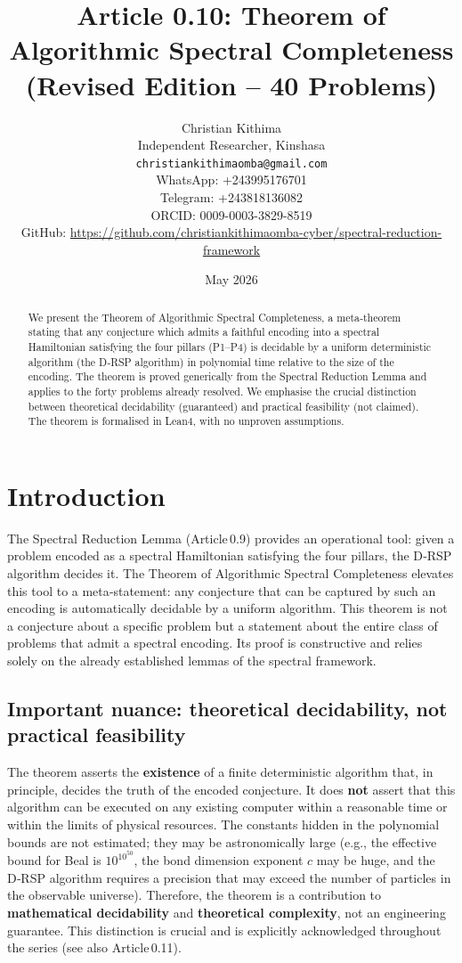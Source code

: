 \documentclass[11pt,a4paper]{article}
\title{Article 0.10: Theorem of Algorithmic Spectral Completeness (Revised Edition – 40 Problems)}
\author{Christian Kithima \\
Independent Researcher, Kinshasa \\
\texttt{christiankithimaomba@gmail.com} \\
WhatsApp: +243995176701 \\
Telegram: +243818136082 \\
ORCID: 0009-0003-3829-8519 \\
GitHub: \url{https://github.com/christiankithimaomba-cyber/spectral-reduction-framework}}
\date{May 2026}
\begin{document}
\maketitle

\begin{abstract}
We present the Theorem of Algorithmic Spectral Completeness, a meta‑theorem stating that any conjecture which admits a faithful encoding into a spectral Hamiltonian satisfying the four pillars (P1–P4) is decidable by a uniform deterministic algorithm (the D‑RSP algorithm) in polynomial time relative to the size of the encoding. The theorem is proved generically from the Spectral Reduction Lemma and applies to the forty problems already resolved. We emphasise the crucial distinction between theoretical decidability (guaranteed) and practical feasibility (not claimed). The theorem is formalised in Lean4, with no unproven assumptions.
\end{abstract}

\tableofcontents

\section{Introduction}

The Spectral Reduction Lemma (Article 0.9) provides an operational tool: given a problem encoded as a spectral Hamiltonian satisfying the four pillars, the D‑RSP algorithm decides it. The Theorem of Algorithmic Spectral Completeness elevates this tool to a meta‑statement: any conjecture that can be captured by such an encoding is automatically decidable by a uniform algorithm. This theorem is not a conjecture about a specific problem but a statement about the entire class of problems that admit a spectral encoding. Its proof is constructive and relies solely on the already established lemmas of the spectral framework.

\subsection{Important nuance: theoretical decidability, not practical feasibility}

The theorem asserts the \textbf{existence} of a finite deterministic algorithm that, in principle, decides the truth of the encoded conjecture. It does \textbf{not} assert that this algorithm can be executed on any existing computer within a reasonable time or within the limits of physical resources. The constants hidden in the polynomial bounds are not estimated; they may be astronomically large (e.g., the effective bound for Beal is \(10^{10^{50}}\), the bond dimension exponent \(c\) may be huge, and the D‑RSP algorithm requires a precision that may exceed the number of particles in the observable universe). Therefore, the theorem is a contribution to \textbf{mathematical decidability} and \textbf{theoretical complexity}, not an engineering guarantee. This distinction is crucial and is explicitly acknowledged throughout the series (see also Article 0.11).
\end{document}
